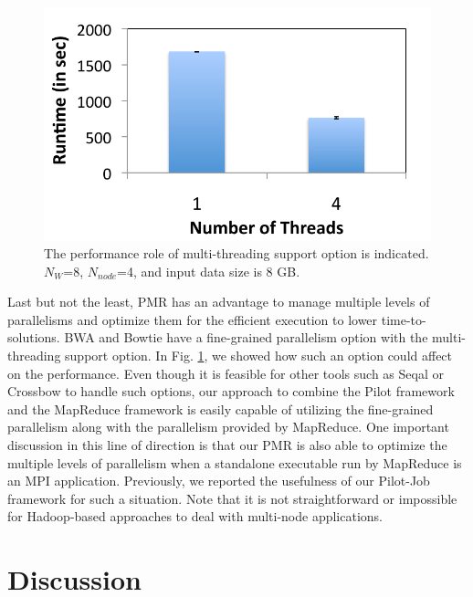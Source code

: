 \documentclass{acm_proc_article-sp}
\begin{document}
\begin{figure} 
 \centering
\includegraphics[scale=0.50]{figures/8GB_4nodes_8w_threadcomp.pdf}
\caption{\small  The performance role of multi-threading support option is indicated.  $N_W$=8, $N_{node}$=4, and input data size is 8 GB.}
  \label{fig:mulit-parallel} 
\end{figure}

Last but not the least, PMR has an advantage to manage multiple levels of parallelisms and optimize them for the efficient execution to lower time-to-solutions.  BWA and Bowtie have a fine-grained parallelism option with the multi-threading support option.   In Fig. \ref{fig:mulit-parallel}, we showed how such an option could affect on the performance.  
Even though it is feasible for other tools such as Seqal or Crossbow to handle such options, our approach to combine the Pilot framework and the MapReduce framework is easily capable of utilizing the fine-grained parallelism along with the parallelism provided by MapReduce.  One important discussion in this line of direction is that our PMR is also able to optimize the multiple levels of parallelism when a standalone executable run by MapReduce is an MPI application.  Previously, we reported the usefulness of our Pilot-Job framework for such a situation\cite{repex_ptrsa}.  Note that it is not straightforward or impossible for Hadoop-based approaches to deal with multi-node applications.


\section{Discussion}\label{sec:discussions}

\end{document}
